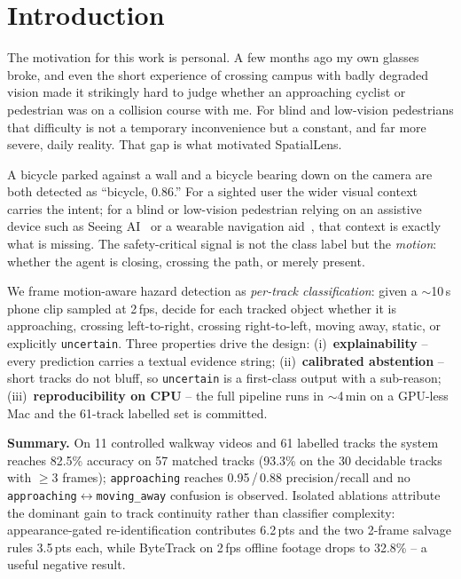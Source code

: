 \documentclass[10pt,twocolumn,letterpaper]{article}
\begin{document}
\section{Introduction}
The motivation for this work is personal. A few months ago my own
glasses broke, and even the short experience of crossing campus with
badly degraded vision made it strikingly hard to judge whether an
approaching cyclist or pedestrian was on a collision course with me.
For blind and low-vision pedestrians that difficulty is not a temporary
inconvenience but a constant, and far more severe, daily reality. That
gap is what motivated SpatialLens.

A bicycle parked against a wall and a bicycle bearing down on the
camera are both detected as ``bicycle, 0.86.'' For a sighted user the
wider visual context carries the intent; for a blind or low-vision
pedestrian relying on an assistive device such as Seeing
AI~\cite{seeingai} or a wearable navigation aid~\cite{poggi2016}, that
context is exactly what is missing. The safety-critical signal is not
the class label but the \emph{motion}: whether the agent is closing,
crossing the path, or merely present.

We frame motion-aware hazard detection as \emph{per-track
classification}: given a $\sim$10\,s phone clip sampled at 2\,fps,
decide for each tracked object whether it is approaching, crossing
left-to-right, crossing right-to-left, moving away, static, or
explicitly \texttt{uncertain}. Three properties drive the design:
(i)~\textbf{explainability} -- every prediction carries a textual
evidence string; (ii)~\textbf{calibrated abstention} -- short tracks
do not bluff, so \texttt{uncertain} is a first-class output with a
sub-reason; (iii)~\textbf{reproducibility on CPU} -- the full pipeline
runs in $\sim$4\,min on a GPU-less Mac and the 61-track labelled set is
committed.

\noindent\textbf{Summary.} On 11 controlled walkway videos and 61
labelled tracks the system reaches 82.5\% accuracy on 57 matched tracks
(93.3\% on the 30 decidable tracks with $\ge$3 frames);
\texttt{approaching} reaches 0.95\,/\,0.88 precision/recall and no
\texttt{approaching}$\leftrightarrow$\texttt{moving\_away} confusion is
observed. Isolated ablations attribute the dominant gain to track
continuity rather than classifier complexity: appearance-gated
re-identification contributes 6.2\,pts and the two 2-frame salvage
rules 3.5\,pts each, while ByteTrack on 2\,fps offline footage drops
to 32.8\% -- a useful negative result.
\end{document}
